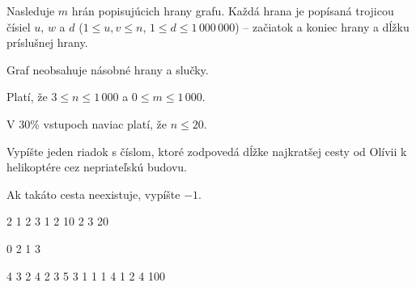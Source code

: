 Nasleduje $m$ hrán popisujúcich hrany grafu. Každá hrana je popísaná trojicou čísiel $u$, $w$ a $d$
($1 \leq u,v \leq n$, $1 \leq d \leq 1\,000\,000$) -- začiatok a koniec hrany a dĺžku príslušnej
hrany.

Graf neobsahuje násobné hrany a slučky.

\smallskip
Platí, že $3 \leq n \leq 1\,000$ a $0 \leq m \leq 1\,000$.

V $30\%$ vstupoch naviac platí, že $n\leq 20$.


Vypíšte jeden riadok s číslom, ktoré zodpovedá dĺžke najkratšej cesty od Olívii k helikoptére cez
nepriateľskú budovu.

Ak takáto cesta neexistuje, vypíšte $-1$.



 2 1 2 3
1 2 10
2 3 20
\sampleEND


\bigskip


 0 2 1 3
\sampleEND


\bigskip


 4 3 2 4
2 3 5
3 1 1
1 4 1
2 4 100
\sampleEND



